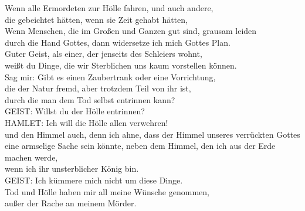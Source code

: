 \begin{playdialog}
Wenn alle Ermordeten zur Hölle fahren, und auch andere,\\
die gebeichtet hätten, wenn sie Zeit gehabt hätten,\\
Wenn Menschen, die im Großen und Ganzen gut sind, grausam leiden\\
durch die Hand Gottes, dann widersetze ich mich Gottes Plan.\\
Guter Geist, als einer, der jenseits des Schleiers wohnt,\\
weißt du Dinge, die wir Sterblichen uns kaum vorstellen können.\\
Sag mir: Gibt es einen Zaubertrank oder eine Vorrichtung,\\
die der Natur fremd, aber trotzdem Teil von ihr ist,\\
durch die man dem Tod selbst entrinnen kann?\\

GEIST: Willst du der Hölle entrinnen?\\

HAMLET: Ich will die Hölle allen verwehren!\\
und den Himmel auch, denn ich ahne, dass der Himmel unseres verrückten Gottes\\
eine armselige Sache sein könnte, neben dem Himmel, den ich aus der Erde machen werde,\\
wenn ich ihr unsterblicher König bin.\\

GEIST: Ich kümmere mich nicht um diese Dinge.\\
Tod und Hölle haben mir all meine Wünsche genommen,\\
außer der Rache an meinem Mörder.\\


\end{playdialog}
